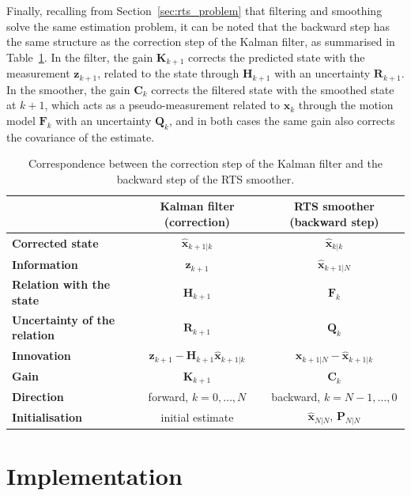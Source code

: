 Finally, recalling from Section~\ref{sec:rts_problem} that filtering and smoothing solve the
same estimation problem, it can be noted that the backward step has the same structure as the
correction step of the Kalman filter, as summarised in Table~\ref{tab:kf_rts}. In the filter, the gain $\mathbf{K}_{k+1}$
corrects the predicted state with the measurement $\mathbf{z}_{k+1}$, related to the state
through $\mathbf{H}_{k+1}$ with an uncertainty $\mathbf{R}_{k+1}$. In the smoother, the gain
$\mathbf{C}_k$ corrects the filtered state with the smoothed state at $k+1$, which acts as a
pseudo-measurement related to $\mathbf{x}_k$ through the motion model $\mathbf{F}_k$ with an
uncertainty $\mathbf{Q}_k$, and in both cases the same gain also corrects the covariance of
the estimate.

\begin{table}[H]
\centering
\small
\renewcommand{\arraystretch}{1.3}
\begin{tabular}{|lcc|}
\hline
 \rowcolor{bluepoli!40} & \textbf{Kalman filter (correction)} & \textbf{RTS smoother (backward step)} \\
\hline\hline
\textbf{Corrected state} & $\hat{\mathbf{x}}_{k+1|k}$ & $\hat{\mathbf{x}}_{k|k}$ \\
\textbf{Information} & $\mathbf{z}_{k+1}$ & $\hat{\mathbf{x}}_{k+1|N}$ \\
\textbf{Relation with the state} & $\mathbf{H}_{k+1}$ & $\mathbf{F}_k$ \\
\textbf{Uncertainty of the relation} & $\mathbf{R}_{k+1}$ & $\mathbf{Q}_k$ \\
\textbf{Innovation} & $\mathbf{z}_{k+1} - \mathbf{H}_{k+1}\hat{\mathbf{x}}_{k+1|k}$ & $\hat{\mathbf{x}}_{k+1|N} - \hat{\mathbf{x}}_{k+1|k}$ \\
\textbf{Gain} & $\mathbf{K}_{k+1}$ & $\mathbf{C}_k$ \\
\textbf{Direction} & forward, $k = 0, \dots, N$ & backward, $k = N-1, \dots, 0$ \\
\textbf{Initialisation} & initial estimate & $\hat{\mathbf{x}}_{N|N}$, $\mathbf{P}_{N|N}$ \\
\hline
\end{tabular}
\caption{Correspondence between the correction step of the Kalman filter and the backward
step of the RTS smoother.}
\label{tab:kf_rts}
\end{table}

\section{Implementation}
\label{sec:rts_implementation}
\label{subsec:rts_window}

